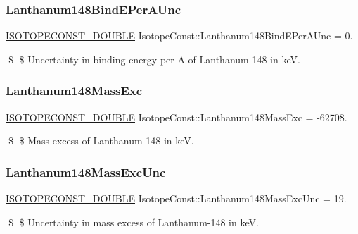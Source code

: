 \subsubsection{\texorpdfstring{Lanthanum148\+Bind\+E\+Per\+A\+Unc}{Lanthanum148BindEPerAUnc}}
{\footnotesize\ttfamily \mbox{\hyperlink{group___isotope_const-_macros_ga8f45a7272ce02c0b4c65c44636ed719a}{I\+S\+O\+T\+O\+P\+E\+C\+O\+N\+S\+T\+\_\+\+D\+O\+U\+B\+LE}} Isotope\+Const\+::\+Lanthanum148\+Bind\+E\+Per\+A\+Unc = 0.}

\$ \$ Uncertainty in binding energy per A of Lanthanum-\/148 in keV. \mbox{\label{group___isotope_const-_lanthanum-_la148_ga6b45ffb494f9e37c60971d890faf77c0}} 
\subsubsection{\texorpdfstring{Lanthanum148\+Mass\+Exc}{Lanthanum148MassExc}}
{\footnotesize\ttfamily \mbox{\hyperlink{group___isotope_const-_macros_ga8f45a7272ce02c0b4c65c44636ed719a}{I\+S\+O\+T\+O\+P\+E\+C\+O\+N\+S\+T\+\_\+\+D\+O\+U\+B\+LE}} Isotope\+Const\+::\+Lanthanum148\+Mass\+Exc = -\/62708.}

\$ \$ Mass excess of Lanthanum-\/148 in keV. \mbox{\label{group___isotope_const-_lanthanum-_la148_ga63e1c6afbf745fb07be0a1fd8e912446}} 
\subsubsection{\texorpdfstring{Lanthanum148\+Mass\+Exc\+Unc}{Lanthanum148MassExcUnc}}
{\footnotesize\ttfamily \mbox{\hyperlink{group___isotope_const-_macros_ga8f45a7272ce02c0b4c65c44636ed719a}{I\+S\+O\+T\+O\+P\+E\+C\+O\+N\+S\+T\+\_\+\+D\+O\+U\+B\+LE}} Isotope\+Const\+::\+Lanthanum148\+Mass\+Exc\+Unc = 19.}

\$ \$ Uncertainty in mass excess of Lanthanum-\/148 in keV. \mbox{\label{group___isotope_const-_lanthanum-_la148_ga9b92a7258b10f0b59f1fd1bd5e867a75}} 
